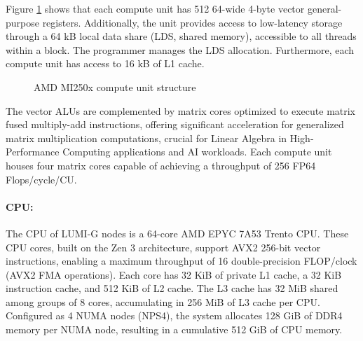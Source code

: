 


Figure \ref{mi250x-compute-unit.svg} shows that each compute unit has 512 64-wide 4-byte vector general-purpose registers. Additionally, the unit provides access to low-latency storage through a 64 kB local data share (LDS, shared memory), accessible to all threads within a block. The programmer manages the LDS allocation. Furthermore, each compute unit has access to 16 kB of L1 cache.

\begin{figure}[H]
    \centering
    \caption{AMD MI250x compute unit structure \cite{lumi}}
    \label{mi250x-compute-unit.svg}
\end{figure}

The vector ALUs are complemented by matrix cores optimized to execute matrix fused multiply-add instructions, offering significant acceleration for generalized matrix multiplication computations, crucial for Linear Algebra in High-Performance Computing applications and AI workloads. Each compute unit houses four matrix cores capable of achieving a throughput of 256 FP64 Flops/cycle/CU.

\paragraph{CPU:}\mbox{}

The CPU of LUMI-G nodes is a 64-core AMD EPYC 7A53 Trento CPU. These CPU cores, built on the Zen 3 architecture, support AVX2 256-bit vector instructions, enabling a maximum throughput of 16 double-precision FLOP/clock (AVX2 FMA operations). Each core has 32 KiB of private L1 cache, a 32 KiB instruction cache, and 512 KiB of L2 cache. The L3 cache has 32 MiB shared among groups of 8 cores, accumulating in 256 MiB of L3 cache per CPU. Configured as 4 NUMA nodes (NPS4), the system allocates 128 GiB of DDR4 memory per NUMA node, resulting in a cumulative 512 GiB of CPU memory.

